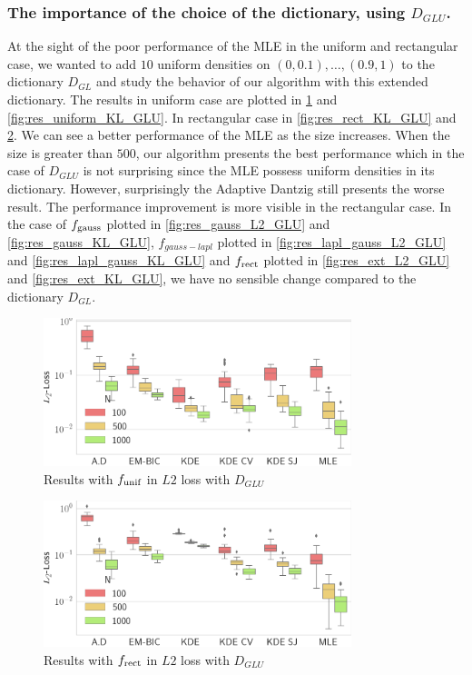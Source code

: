 \subsubsection{The importance of the choice of the dictionary, using $D_{GLU}$. \label{dict_dglu_sect}}
At the sight of the poor performance of the MLE in the uniform and rectangular case, we wanted to add $10$ uniform densities on $(0,0.1),\dots,(0.9,1)$ to the dictionary $D_{GL}$ and study the behavior of our algorithm with this extended dictionary. The results in uniform case are plotted in \cref{fig:res_uniform_L2_GLU} and \cref{fig:res_uniform_KL_GLU}. In rectangular case in \cref{fig:res_rect_KL_GLU} and \cref{fig:res_rect_L2_GLU}. We can see a better performance of the MLE as the size increases. When the size is greater than $500$, our algorithm presents the best performance which in the case of $D_{GLU}$ is not surprising since the MLE possess uniform densities in its dictionary. However, surprisingly the Adaptive Dantzig still presents the worse result. The performance improvement is more visible in the rectangular case. In the case of $f_{\textnormal{gauss}}$ plotted in \cref{fig:res_gauss_L2_GLU} and \cref{fig:res_gauss_KL_GLU}, $f_{gauss-lapl}$ plotted in \cref{fig:res_lapl_gauss_L2_GLU} and \cref{fig:res_lapl_gauss_KL_GLU} and $f_{\textnormal{rect}}$ plotted in \cref{fig:res_ext_L2_GLU} and \cref{fig:res_ext_KL_GLU}, we have no sensible change compared to the dictionary $D_{GL}$.
\begin{figure}
\center
    \includegraphics[width=0.8\textwidth]{./TeX_files/res_uniform_L2_GLU.png}
    \caption{Results with $f_{\textnormal{unif}}$ in $L2$ loss with $D_{GLU}$}
    \label{fig:res_uniform_L2_GLU}
\end{figure}
\begin{figure}
\center
    \includegraphics[width=0.8\textwidth]{./TeX_files/res_rect_L2_GLU.png}
    \caption{Results with $f_{\textnormal{rect}}$ in $L2$ loss with $D_{GLU}$}
    \label{fig:res_rect_L2_GLU}
\end{figure}
